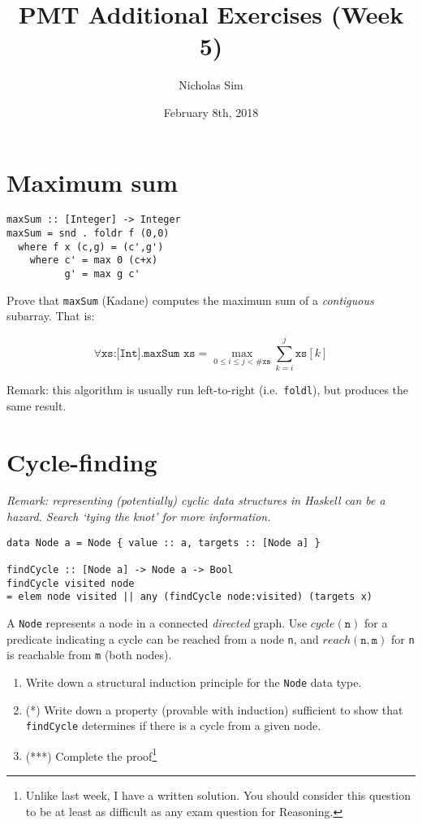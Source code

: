 \documentclass[10pt,a4paper]{article}
\newcommand{\reach}[2]{reach(\texttt{#1},\texttt{#2})}
\begin{document}
\title{PMT Additional Exercises (Week 5)}
\author{Nicholas Sim}
\date{February 8th, 2018}
\maketitle{}


\section{Maximum sum}

\begin{lstlisting}
maxSum :: [Integer] -> Integer
maxSum = snd . foldr f (0,0)
  where f x (c,g) = (c',g')
    where c' = max 0 (c+x)
          g' = max g c'
\end{lstlisting}

Prove that \texttt{maxSum} (Kadane) computes the maximum sum of a \emph{contiguous} subarray.
That is:

\[ \forall \texttt{xs:[Int].maxSum xs} = \max_{0\le i \le j < \texttt{\#xs}} \sum_{k=i}^{j} \texttt{xs}[k] \]

Remark: this algorithm is usually run left-to-right (i.e.~\texttt{foldl}), but produces the same result.


\section{Cycle-finding}
\emph{Remark: representing (potentially) cyclic data structures in Haskell can be a hazard. Search `tying the knot' for more information.}

\begin{lstlisting}
data Node a = Node { value :: a, targets :: [Node a] }

findCycle :: [Node a] -> Node a -> Bool
findCycle visited node
= elem node visited || any (findCycle node:visited) (targets x)
\end{lstlisting}

A \texttt{Node} represents a node in a connected \emph{directed} graph.
Use \(cycle(\texttt{n})\) for a predicate indicating a cycle can be reached from a node \texttt{n}, and \( \reach n m \) for \texttt{n} is reachable from \texttt{m} (both nodes).

\begin{enumerate}
	\item Write down a structural induction principle for the \texttt{Node} data type.
	\item (*) Write down a property (provable with induction) sufficient to show that \texttt{findCycle} determines if there is a cycle from a given node.
	\item (***) Complete the proof\footnote{Unlike last week, I have a written solution. You should consider this question to be at least as difficult as any exam question for Reasoning.}
\end{enumerate}
\end{document}
